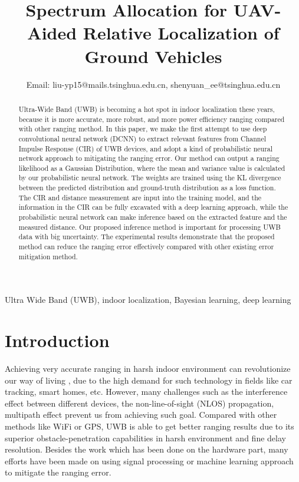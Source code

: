 \documentclass{IEEEtran}
\title{ Spectrum Allocation for UAV-Aided Relative Localization of Ground Vehicles}
\author{
\vspace{0.2cm}
\IEEEauthorblockN{
Yuanpeng~Liu and
Yuan~Shen}
\IEEEauthorblockA{
Tsinghua National Laboratory for Information Science and Technology\\
Department of Electronic Engineering,
Tsinghua University,
Beijing 100084, China\\
}
Email: liu-yp15@mails.tsinghua.edu.cn,
shenyuan\_ee@tsinghua.edu.cn
}
\begin{document}
\maketitle
\begin{abstract}
Ultra-Wide Band (UWB) is becoming a hot spot in indoor localization these years, because it is more accurate, more robust, and more power efficiency ranging compared with other ranging method. In this paper, we make the first attempt to use deep convolutional neural network (DCNN) to extract relevant features from Channel Impulse Response (CIR) of UWB devices, and adopt a kind of probabilistic neural network approach to mitigating the ranging error. Our method can output a ranging likelihood as a Gaussian Distribution, where the mean and variance value is calculated by our probabilistic neural network. The weights are trained using the KL divergence between the predicted distribution and ground-truth distribution as a loss function. The CIR and distance measurement are input into the training model, and the information in the CIR can be fully excavated with a deep learning approach, while the probabilistic neural network can make inference based on the extracted feature and the measured distance. Our proposed inference method is important for processing UWB data with big uncertainty. The experimental results demonstrate that the proposed method can reduce the ranging error effectively compared with other existing error mitigation method.
\end{abstract}

\begin{IEEEkeywords}
Ultra Wide Band (UWB), indoor localization, Bayesian learning, deep learning
\end{IEEEkeywords}

\section{Introduction}

Achieving very accurate ranging in harsh indoor environment can revolutionize our way of living , due to the high demand for such technology in fields like car tracking, smart homes, etc. However, many challenges such as the interference effect between different devices, the non-line-of-sight (NLOS) propagation, multipath effect prevent us from achieving such goal. Compared with other methods like WiFi or GPS, UWB is able to get better ranging results due to its superior obstacle-penetration capabilities in harsh environment and fine delay resolution. Besides the work which has been done on the hardware part, many efforts have been made on using signal processing or machine learning approach to mitigate the ranging error.
\end{document}
